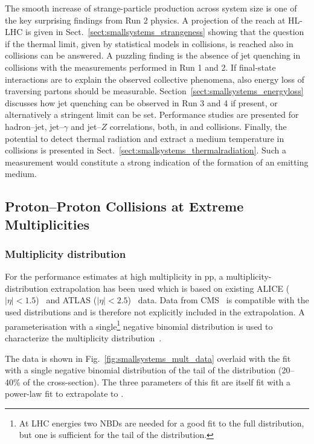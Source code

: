 \documentclass[../report.tex]{subfiles}
\begin{document}
The smooth increase of strange-particle production across system size is one of the key surprising findings from Run 2 \pp physics. A projection of the reach at HL-LHC is given in Sect.~\ref{sect:smallsystems_strangeness} showing that the question if the thermal limit, given by statistical models in \PbPb collisions, is reached also in \pp collisions can be answered.
A puzzling finding is the absence of jet quenching in \pPb collisions with the measurements performed in Run 1 and 2. If final-state interactions are to explain the observed collective phenomena, also energy loss of traversing partons should be measurable. 
Section~\ref{sect:smallsystems_energyloss} discusses how jet quenching can be observed in Run 3 and 4 if present, or alternatively a stringent limit can be set. Performance studies are presented for hadron--jet, jet--$\gamma$ and jet--$Z$ correlations, both, in \pPb and \pp collisions.
Finally, the potential to detect thermal radiation and extract a medium temperature in \pPb collisions is presented in Sect.~\ref{sect:smallsystems_thermalradiation}. Such a measurement would constitute a strong indication of the formation of an emitting medium. 

\subsection{Proton--Proton Collisions at Extreme Multiplicities}
\label{sect:smallsystems_multiplicity}

\subsubsection{Multiplicity distribution}

For the performance estimates at high multiplicity in pp, a multiplicity-distribution extrapolation has been used which is based on existing ALICE ($|\eta| < 1.5$)~\cite{Adam:2015gka} and ATLAS ($|\eta|< 2.5$)~\cite{Aad:2010ac,Aad:2016xww} data. Data from CMS~\cite{Khachatryan:2010nk} is compatible with the used distributions and is therefore not explicitly included in the extrapolation. A parameterisation with a single\footnote{At LHC energies two NBDs are needed for a good fit to the full distribution, but one is sufficient for the tail of the distribution.} negative binomial distribution is used to characterize the multiplicity distribution~\cite{GrosseOetringhaus:2009kz,ALICE:2017pcy}.

The data is shown in Fig.~\ref{fig:smallsystems_mult_data} overlaid with the fit with a single negative binomial distribution of the tail of the distribution (20--40\% of the cross-section). The three parameters of this fit are itself fit with a power-law fit to extrapolate to \unit[14]{\UTeV}.
\end{document}
